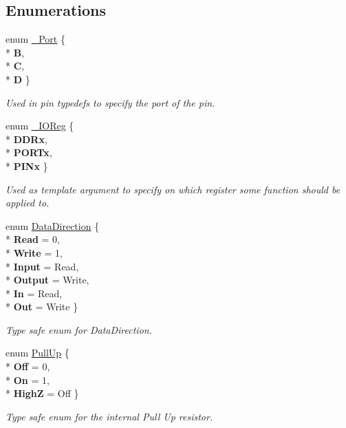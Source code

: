 \subsection*{Enumerations}
\begin{DoxyCompactItemize}
\item 
enum \hyperlink{namespaceports_a9949317f344930bd6ad1097e80c97b67}{\+\_\+\+Port} \{ \\*
{\bfseries B}, 
\\*
{\bfseries C}, 
\\*
{\bfseries D}
 \}\begin{DoxyCompactList}\small\item\em Used in pin typedefs to specify the port of the pin. \end{DoxyCompactList}
\item 
enum \hyperlink{namespaceports_a739630fb6b9a9b963453db8e865b6b14}{\+\_\+\+I\+O\+Reg} \{ \\*
{\bfseries D\+D\+Rx}, 
\\*
{\bfseries P\+O\+R\+Tx}, 
\\*
{\bfseries P\+I\+Nx}
 \}\begin{DoxyCompactList}\small\item\em Used as template argument to specify on which register some function should be applied to. \end{DoxyCompactList}
\item 
enum \hyperlink{namespaceports_a46987e78fa447129742fadda5eccafb4}{Data\+Direction} \{ \\*
{\bfseries Read} = 0, 
\\*
{\bfseries Write} = 1, 
\\*
{\bfseries Input} = Read, 
\\*
{\bfseries Output} = Write, 
\\*
{\bfseries In} = Read, 
\\*
{\bfseries Out} = Write
 \}\begin{DoxyCompactList}\small\item\em Type safe enum for Data\+Direction. \end{DoxyCompactList}
\item 
enum \hyperlink{namespaceports_a49bf0ccedb4cfed89a328574e53bec07}{Pull\+Up} \{ \\*
{\bfseries Off} = 0, 
\\*
{\bfseries On} = 1, 
\\*
{\bfseries HighZ} = Off
 \}\begin{DoxyCompactList}\small\item\em Type safe enum for the internal Pull Up resistor. \end{DoxyCompactList}
\end{DoxyCompactItemize}
